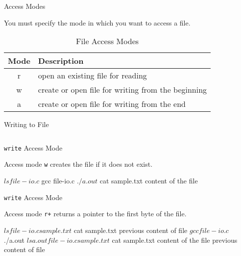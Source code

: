 \documentclass[compress]{beamer}
\begin{document}
\begin{slide}
	\begin{block}{Access Modes}

	You must specify the mode in which you want to access a file.

	\begin{table}
	\begin{tabular}{cl}
	\toprule
	Mode & Description\\
	\midrule
	r & open an existing file for reading\\
	w & create or open file for writing from the beginning\\
	a & create or open file for writing from the end\\
	\bottomrule
	\end{tabular}
	\caption{File Access Modes}
	\end{table}

	\end{block}
\end{slide}

\begin{slide}
	\begin{block}{Writing to File}

	\inputminted[fontsize=\scriptsize, firstline=10, linenos]{c}{
		\resDirectory/fileio-w.c
	}

	\end{block}
\end{slide}

\begin{slide}
	\begin{block}{\texttt{write} Access Mode}

	Access mode \alert{\texttt{w}} creates the file if it does not exist.

	\begin{terminal}
	$ ls
	file-io.c
	$ gcc file-io.c
	$ ./a.out
	$ cat sample.txt
	content of the file
	\end{terminal}

	\end{block}
\end{slide}

\begin{slide}
	\begin{block}{\texttt{write} Access Mode}

	Access mode \alert{\texttt{r+}} returns a pointer to the first byte of the file.

	\begin{terminal}
	$ ls
	file-io.c sample.txt
	$ cat sample.txt
	previous content of file
	$ gcc file-io.c
	$ ./a.out
	$ ls
	a.out file-io.c sample.txt
	$ cat sample.txt
	content of the file
	previous content of file
	\end{terminal}

	\end{block}
\end{slide}
\end{document}
